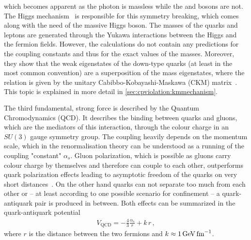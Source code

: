 which becomes apparent as the photon is massless while the \Wpm and \Z bosons
are not. The Higgs mechanism~\cite{Higgs:1964pj} is responsible for this
symmetry breaking, which comes along with the need of the massive Higgs boson.
The masses of the quarks and leptons are generated through the Yukawa
interactions between the Higgs and the fermion fields. However, the
calculations do not contain any predictions for the coupling constants and
thus for the exact values of the masses. Moreover, they show that the weak
eigenstates of the down-type quarks (at least in the most common convention)
are a superposition of the mass eigenstates, where the relation is given by
the unitary Cabibbo-Kobayashi-Maskawa (CKM) matrix~\cite{Kobayashi:1973fv}.
This topic is explained in more detail in \cref{sec:cpviolation:kmmechanism}.


The third fundamental, strong force is described by the Quantum Chromodynamics
(QCD). It describes the binding between quarks and gluons, which are the
mediators of this interaction, through the colour charge in an $SU(3)$ gauge
symmetry group. The coupling heavily depends on the momentum scale, which in
the renormalisation theory can be understood as a running of the coupling
"constant" $\alpha_s$. Gluon polarization, which is possible as gluons carry
colour charge by themselves and therefore can couple to each other,
outperforms quark polarization effects leading to asymptotic freedom of the
quarks on very short
distances~\cite{AsymptoticFreedom_GrossWilczek,AsymptoticFreedom_Politzer}. On
the other hand quarks can not separate too much from each other or -- at least
according to one possible scenario for confinement -- a quark-antiquark pair
is produced in between. Both effects can be summarized in the quark-antiquark
potential
\begin{align}
	V_{\mathrm{QCD}} = - \frac 43 \frac{\alpha_s}{r} + k\,r\,,
\end{align}
where $r$ is the distance between the two fermions and $k \approx
\SI{1}{\GeV\fm^{-1}}$.
